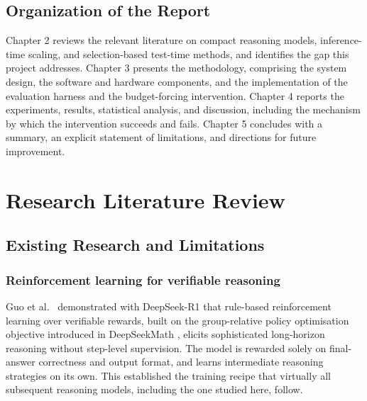 \documentclass[12pt,a4paper,oneside]{report}
\begin{document}
\section{Organization of the Report}

Chapter 2 reviews the relevant literature on compact reasoning models,
inference-time scaling, and selection-based test-time methods, and identifies
the gap this project addresses. Chapter 3 presents the methodology, comprising
the system design, the software and hardware components, and the implementation
of the evaluation harness and the budget-forcing intervention. Chapter 4
reports the experiments, results, statistical analysis, and discussion,
including the mechanism by which the intervention succeeds and fails. Chapter 5
concludes with a summary, an explicit statement of limitations, and directions
for future improvement.

\chapter{Research Literature Review}

\section{Existing Research and Limitations}

\subsection*{Reinforcement learning for verifiable reasoning}

Guo et al.\ \cite{deepseekr1} demonstrated with DeepSeek-R1 that rule-based
reinforcement learning over verifiable rewards, built on the group-relative
policy optimisation objective introduced in DeepSeekMath \cite{deepseekmath},
elicits sophisticated long-horizon reasoning without step-level supervision. The
model is rewarded solely on final-answer correctness and output format, and
learns intermediate reasoning strategies on its own. This established the
training recipe that virtually all subsequent reasoning models, including the
one studied here, follow.
\end{document}
